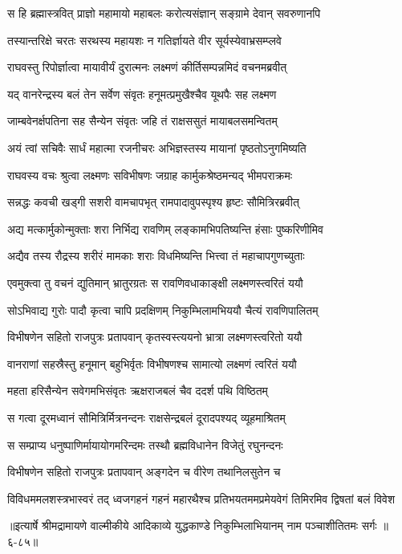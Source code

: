 \twolineshloka
{स हि ब्रह्मास्त्रवित् प्राज्ञो महामायो महाबलः}
{करोत्यसंज्ञान् सङ्ग्रामे देवान् सवरुणानपि} %

\twolineshloka
{तस्यान्तरिक्षे चरतः सरथस्य महायशः}
{न गतिर्ज्ञायते वीर सूर्यस्येवाभ्रसम्प्लवे} %

\twolineshloka
{राघवस्तु रिपोर्ज्ञात्वा मायावीर्यं दुरात्मनः}
{लक्ष्मणं कीर्तिसम्पन्नमिदं वचनमब्रवीत्} %

\twolineshloka
{यद् वानरेन्द्रस्य बलं तेन सर्वेण संवृतः}
{हनूमत्प्रमुखैश्चैव यूथपैः सह लक्ष्मण} %

\twolineshloka
{जाम्बवेनर्क्षपतिना सह सैन्येन संवृतः}
{जहि तं राक्षससुतं मायाबलसमन्वितम्} %

\twolineshloka
{अयं त्वां सचिवैः सार्धं महात्मा रजनीचरः}
{अभिज्ञस्तस्य मायानां पृष्ठतोऽनुगमिष्यति} %

\twolineshloka
{राघवस्य वचः श्रुत्वा लक्ष्मणः सविभीषणः}
{जग्राह कार्मुकश्रेष्ठमन्यद् भीमपराक्रमः} %

\twolineshloka
{सन्नद्धः कवची खड्गी सशरी वामचापभृत्}
{रामपादावुपस्पृश्य हृष्टः सौमित्रिरब्रवीत्} %

\twolineshloka
{अद्य मत्कार्मुकोन्मुक्ताः शरा निर्भिद्य रावणिम्}
{लङ्कामभिपतिष्यन्ति हंसाः पुष्करिणीमिव} %

\twolineshloka
{अद्यैव तस्य रौद्रस्य शरीरं मामकाः शराः}
{विधमिष्यन्ति भित्त्वा तं महाचापगुणच्युताः} %

\twolineshloka
{एवमुक्त्वा तु वचनं द्युतिमान् भ्रातुरग्रतः}
{स रावणिवधाकाङ्क्षी लक्ष्मणस्त्वरितं ययौ} %

\twolineshloka
{सोऽभिवाद्य गुरोः पादौ कृत्वा चापि प्रदक्षिणम्}
{निकुम्भिलामभिययौ चैत्यं रावणिपालितम्} %

\twolineshloka
{विभीषणेन सहितो राजपुत्रः प्रतापवान्}
{कृतस्वस्त्ययनो भ्रात्रा लक्ष्मणस्त्वरितो ययौ} %

\twolineshloka
{वानराणां सहस्रैस्तु हनूमान् बहुभिर्वृतः}
{विभीषणश्च सामात्यो लक्ष्मणं त्वरितं ययौ} %

\twolineshloka
{महता हरिसैन्येन सवेगमभिसंवृतः}
{ऋक्षराजबलं चैव ददर्श पथि विष्ठितम्} %

\twolineshloka
{स गत्वा दूरमध्वानं सौमित्रिर्मित्रनन्दनः}
{राक्षसेन्द्रबलं दूरादपश्यद् व्यूहमाश्रितम्} %

\twolineshloka
{स सम्प्राप्य धनुष्पाणिर्मायायोगमरिन्दमः}
{तस्थौ ब्रह्मविधानेन विजेतुं रघुनन्दनः} %

\twolineshloka
{विभीषणेन सहितो राजपुत्रः प्रतापवान्}
{अङ्गदेन च वीरेण तथानिलसुतेन च} %

\twolineshloka
{विविधममलशस्त्रभास्वरं तद् ध्वजगहनं गहनं महारथैश्च}
{प्रतिभयतममप्रमेयवेगं तिमिरमिव द्विषतां बलं विवेश} %


॥इत्यार्षे श्रीमद्रामायणे वाल्मीकीये आदिकाव्ये युद्धकाण्डे निकुम्भिलाभियानम् नाम पञ्चाशीतितमः सर्गः ॥६-८५॥
